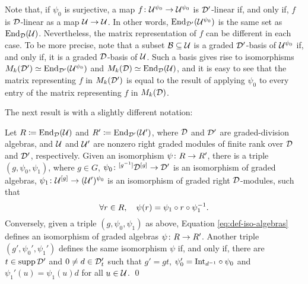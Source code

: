\begin{remark}\label{rmk:twist-does-not-change-set}
	Note that, if $\psi_0$ is surjective, a map $f\colon \mathcal U^{\psi_0} \to \mathcal U^{\psi_0}$ is $\mathcal{D}'$-linear if, and only if, $f$ is $\mathcal{D}$-linear as a map $\mathcal U\to \mathcal U$. 
	In other words, $\operatorname{End}_{\mathcal{D}'} (\mathcal U^{\psi_0})$ is the same set as $\operatorname{End}_{\mathcal{D}} (\mathcal U)$. 
	Nevertheless, the matrix representation of $f$ can be different in each case. 
	To be more precise, note that a subset $\mathcal B \subseteq \mathcal U$ is a graded $\mathcal{D}'$-basis of $\mathcal U^{\psi_0}$ if, and only if, it is a graded $\mathcal{D}$-basis of $\mathcal U$. 
	Such a basis gives rise to isomorphisms $M_k(\mathcal{D}') \simeq \operatorname{End}_{\mathcal{D}'} (\mathcal U^{\psi_0})$ and $M_k(\mathcal{D}) \simeq \operatorname{End}_{\mathcal{D}} (\mathcal U)$, and it is easy to see that the matrix representing $f$ in $M_k(\mathcal{D}')$ is equal to the result of applying $\psi_0$ to every entry of the matrix representing $f$ in $M_k(\mathcal{D})$.
\end{remark}

The next result is \cite[Theorem 2.10]{livromicha} with a slightly different notation:

\begin{thm}\label{thm:iso-abstract}
	Let $R \coloneqq \operatorname{End}_{\mathcal{D}}(\mathcal U)$ and $R' \coloneqq \operatorname{End}_{\mathcal{D}'}(\mathcal U')$, where $\mathcal{D}$ and $\mathcal{D}'$ are graded-division algebras, and $\mathcal U$ and $\mathcal U'$ are nonzero right graded modules of finite rank over $\mathcal{D}$ and $\mathcal{D}'$, respectively.
	Given an isomorphism $\psi\colon R \to R'$, there is a triple $(g, \psi_0, \psi_1)$, where $g \in G$, $\psi_0\colon {}^{[g^{-1}]}\mathcal{D}^{[g]} \to \mathcal{D}'$ is an isomorphism of graded algebras, $\psi_1\colon \mathcal U^{[g]} \to (\mathcal U')^{\psi_0}$ is an isomorphism of graded right $\mathcal{D}$-modules, such that
	\begin{equation}\label{eq:def-iso-algebras}
		\forall r\in R, \quad \psi(r) = \psi_1 \circ r \circ \psi_1^{-1}.
	\end{equation}
	Conversely, given a triple $(g, \psi_0, \psi_1)$ as above, Equation \eqref{eq:def-iso-algebras} defines an isomorphism of graded algebras $\psi\colon R \to R'$.
	Another triple $(g', \psi_0', \psi_1')$ defines the same isomorphism $\psi$ if, and only if, there are $t\in \operatorname{supp} \mathcal{D}'$ and $0 \neq d\in \mathcal{D}'_t$ such that $g'= gt$, $\psi_0' = \mathrm{Int}_{d^{-1}} \circ \psi_0$ and $\psi_1' (u) = \psi_1 (u) d$ for all $u \in \mathcal U$. \qed
\end{thm}

